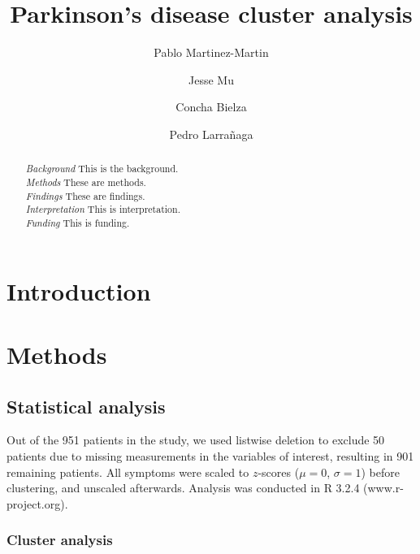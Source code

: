 \documentclass[preprint,3p,twocolumn]{elsarticle} %
\begin{document}
\begin{frontmatter}
\title{Parkinson's disease cluster analysis}
\author[c3]{Pablo Martinez-Martin}
\author[bc]{Jesse Mu}
\author[cig]{Concha Bielza}
\author[cig]{Pedro Larra\~naga}
\address[c3]{Area of Applied Epidemiology, National Centre of Epidemiology and CIBERNED, Carlos III Institute of Health, Madrid, Spain}
\address[bc]{Department of Computer Science, Boston College, Chestnut Hill, Massachusetts, USA}
\address[cig]{Computational Intelligence Group, Polytechnic University of Madrid, Madrid, Spain}

\begin{abstract}
\emph{Background} \quad This is the background. \\
\emph{Methods} \quad  These are methods. \\
\emph{Findings} \quad These are findings. \\
\emph{Interpretation} \quad This is interpretation. \\
\emph{Funding} \quad This is funding.
\end{abstract}
\end{frontmatter}


\section{Introduction}

\section{Methods}

\subsection{Statistical analysis}

Out of the 951 patients in the study, we used listwise deletion to exclude 50 patients due to
missing measurements in the variables of interest, resulting in 901 remaining patients. All
symptoms were scaled to $z$-scores ($\mu = 0$, $\sigma = 1$) before clustering, and unscaled
afterwards. Analysis was conducted in R 3.2.4 (www.r-project.org).

\subsubsection{Cluster analysis}
\end{document}
